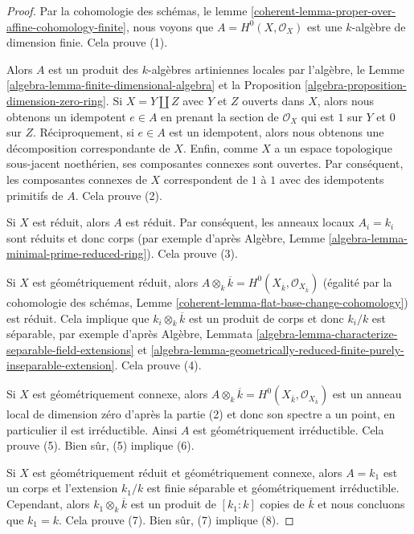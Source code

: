 \begin{proof}
Par la cohomologie des schémas, le lemme
\ref{coherent-lemma-proper-over-affine-cohomology-finite},
nous voyons que $A = H^0(X, \mathcal{O}_X)$ est
une $k$-algèbre de dimension finie. Cela prouve (1).

\medskip\noindent
Alors $A$ est un produit des $k$-algèbres artiniennes locales par
l'algèbre, le Lemme
\ref{algebra-lemma-finite-dimensional-algebra} et la Proposition
\ref{algebra-proposition-dimension-zero-ring}. Si $X = Y \amalg Z$
avec $Y$ et $Z$ ouverts dans $X$, alors nous obtenons un idempotent $e
\in A$ en prenant la section de $\mathcal{O}_X$ qui est $1$ sur $Y$ et
$0$ sur $Z$. Réciproquement, si $e \in A$ est un idempotent, alors nous
obtenons une décomposition correspondante de $X$. Enfin, comme $X$ a un
espace topologique sous-jacent noethérien, ses composantes connexes
sont ouvertes. Par conséquent, les composantes connexes de $X$
correspondent de $1$ à $1$ avec des idempotents primitifs de $A$. Cela prouve (2).

\medskip\noindent
Si $X$ est réduit, alors $A$ est réduit. Par
conséquent, les anneaux locaux $A_i = k_i$ sont réduits
et donc corps (par exemple d'après Algèbre, Lemme
\ref{algebra-lemma-minimal-prime-reduced-ring}). Cela prouve (3).

\medskip\noindent
Si $X$ est géométriquement réduit, alors $A
\otimes_k \overline{k} = H^0(X_{\overline{k}},
\mathcal{O}_{X_{\overline{k}}})$ (égalité par la
cohomologie des schémas, Lemme
\ref{coherent-lemma-flat-base-change-cohomology})
est réduit. Cela implique que $k_i \otimes_k
\overline{k}$ est un produit de corps et donc $k_i/k$
est séparable, par exemple d'après Algèbre, Lemmata
\ref{algebra-lemma-characterize-separable-field-extensions}
et
\ref{algebra-lemma-geometrically-reduced-finite-purely-inseparable-extension}. Cela prouve (4).

\medskip\noindent
Si $X$ est géométriquement connexe, alors $A \otimes_k
\overline{k} = H^0(X_{\overline{k}},
\mathcal{O}_{X_{\overline{k}}})$ est un anneau local de
dimension zéro d'après la partie (2) et donc son spectre a un
point, en particulier il est irréductible. Ainsi $A$ est
géométriquement irréductible. Cela prouve (5). Bien sûr, (5) implique (6).

\medskip\noindent
Si $X$ est géométriquement réduit et géométriquement connexe, alors
$A = k_1$ est un corps et l'extension $k_1/k$ est finie séparable et
géométriquement irréductible. Cependant, alors $k_1 \otimes_k
\overline{k}$ est un produit de $[k_1 : k]$ copies de $\overline{k}$ et
nous concluons que $k_1 = k$. Cela prouve (7). Bien sûr, (7) implique (8).
\end{proof}

